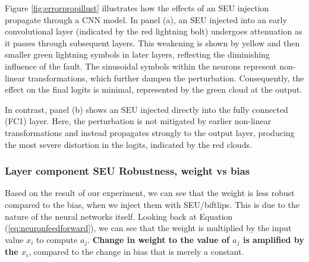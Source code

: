 \documentclass[ %
                    author={Revalda Putawara},
                supervisor={Dr. James Pope},
                    degree={MSc},
                     title={Robustness of Bayesian Neural Networks Design Choices Against Weight and Bias Perturbation Induced by Single Event Upsets (SEUs)},
                      type={},
                      year={2025}]{dissertation}
\begin{document}


Figure \ref{fig:errorpropillust} illustrates how the effects of an SEU injection propagate through a CNN model. In panel (a), an SEU injected into an early convolutional layer (indicated by the red lightning bolt) undergoes attenuation as it passes through subsequent layers. This weakening is shown by yellow and then smaller green lightning symbols in later layers, reflecting the diminishing influence of the fault. The sinusoidal symbols within the neurons represent non-linear transformations, which further dampen the perturbation. Consequently, the effect on the final logits is minimal, represented by the green cloud at the output.

In contrast, panel (b) shows an SEU injected directly into the fully connected (FC1) layer. Here, the perturbation is not mitigated by earlier non-linear transformations and instead propagates strongly to the output layer, producing the most severe distortion in the logits, indicated by the red clouds.

\subsubsection{Layer component SEU Robustness, weight vs bias}

Based on the result of our experiment, we can see that the weight is less robust compared to the bias, when we inject them with SEU/biftlips. This is due to the nature of the neural networks itself. Looking back at Equation (\ref{eq:neuronfeedforward}), we can see that the weight is multiplied by the input value $x_i$ to compute $a_j$. \textbf{Change in weight to the value of $a_j$ is amplified by the $x_i$}, compared to the change in bias that is merely a constant.
\end{document}
